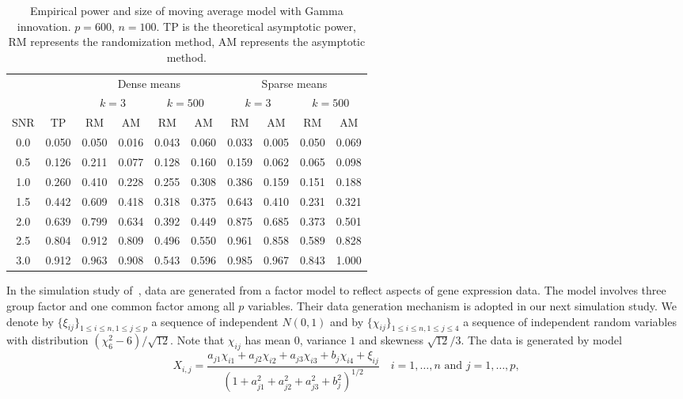 \documentclass[review]{elsarticle}
\theoremstyle{plain}
\theoremstyle{definition}
\theoremstyle{remark}
\begin{document}
\begin{table}[ht]
    \caption{Empirical power and size of moving average model with Gamma innovation.  $p=600$, $n=100$. TP is the theoretical asymptotic power, RM represents the randomization method, AM represents the asymptotic method.}
    \centering
    \begin{tabular}{cccccccccc}
          \toprule
          & & \multicolumn{4}{c}{Dense means} &\multicolumn{4}{c}{Sparse means}\\
          \cmidrule(r){3-6}\cmidrule(r){7-10}
          & & \multicolumn{2}{c}{$k=3$} & \multicolumn{2}{c}{$k=500$} & \multicolumn{2}{c}{$k=3$}& \multicolumn{2}{c}{$k=500$}\\
          \cmidrule(r){3-4}  \cmidrule(r){5-6} \cmidrule(r){7-8}  \cmidrule(r){9-10}
           SNR& TP & RM & AM & RM & AM & RM & AM & RM & AM \\ 
            \midrule
        0.0 & 0.050 & 0.050 & 0.016 & 0.043 & 0.060 & 0.033 & 0.005 & 0.050 & 0.069 \\ 
      0.5 & 0.126 & 0.211 & 0.077 & 0.128 & 0.160 & 0.159 & 0.062 & 0.065 & 0.098 \\ 
        1.0 & 0.260 & 0.410 & 0.228 & 0.255 & 0.308 & 0.386 & 0.159 & 0.151 & 0.188 \\ 
      1.5 & 0.442 & 0.609 & 0.418 & 0.318 & 0.375 & 0.643 & 0.410 & 0.231 & 0.321 \\ 
        2.0 & 0.639 & 0.799 & 0.634 & 0.392 & 0.449 & 0.875 & 0.685 & 0.373 & 0.501 \\ 
      2.5 & 0.804 & 0.912 & 0.809 & 0.496 & 0.550 & 0.961 & 0.858 & 0.589 & 0.828 \\ 
        3.0 & 0.912 & 0.963 & 0.908 & 0.543 & 0.596 & 0.985 & 0.967 & 0.843 & 1.000 \\ 
        \bottomrule
    \end{tabular}
\end{table}
In the simulation study of~\cite{fan2007to}, data are generated from a factor model to reflect aspects of gene expression data. The model involves three group factor and one common factor among all $p$ variables. 
 Their data generation mechanism is adopted in our next simulation study.
We denote by $\{\xi_{ij}\}_{1\leq i\leq n, 1\leq j\leq p}$ a sequence of independent $N(0,1)$ and by $\{\chi_{ij}\}_{1\leq i \leq n, 1\leq j \leq 4}$ a sequence of independent random variables with distribution $(\chi_{6}^2-6)/\sqrt{12}$.
Note that $\chi_{ij}$ has mean $0$, variance $1$ and skewness $\sqrt{12}/3$.
The data is generated by model
\begin{equation*}
    X_{i,j}=\frac{a_{j1}\chi_{i1}+a_{j2}\chi_{i2}+a_{j3}\chi_{i3}+b_{j}\chi_{i4}+\xi_{ij}}{{(1+a_{j1}^2+a_{j2}^2+a_{j3}^2+b_j^2)}^{1/2}}
    \quad
    \textrm{$i=1,\ldots, n$ and $j=1,\ldots, p$},
\end{equation*}
\end{document}
